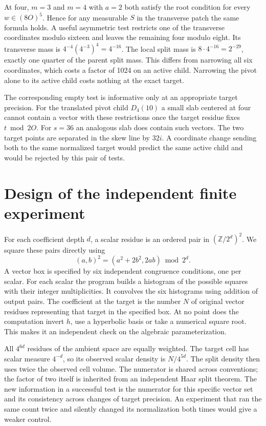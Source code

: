\documentclass[12pt,letterpaper]{article}
\begin{document}
At four, $m=3$ and $m=4$ with $a=2$ both satisfy the root condition for every $w\in(8O)^5$. Hence for any measurable $S$ in the transverse patch the same formula holds. A useful asymmetric test restricts one of the transverse coordinates modulo sixteen and leaves the remaining four modulo eight. Its transverse mass is $4^{-4}(4^{-3})^4=4^{-16}$. The local split mass is $8\cdot4^{-16}=2^{-29}$, exactly one quarter of the parent split mass. This differs from narrowing all six coordinates, which costs a factor of 1024 on an active child. Narrowing the pivot alone to its active child costs nothing at the exact target.

The corresponding empty test is informative only at an appropriate target precision. For the translated pivot child $D_4(10)$ a small slab centered at four cannot contain a vector with these restrictions once the target residue fixes $t\bmod2O$. For $s=36$ an analogous slab does contain such vectors. The two target points are separated in the skew line by $32i$. A coordinate change sending both to the same normalized target would predict the same active child and would be rejected by this pair of tests.

\section{Design of the independent finite experiment}
For each coefficient depth $d$, a scalar residue is an ordered pair in $(\mathbb Z/2^d)^2$. We square these pairs directly using
\[
       (a,b)^2=(a^2+2b^2,2ab)\bmod 2^d.
\]
A vector box is specified by six independent congruence conditions, one per scalar. For each scalar the program builds a histogram of the possible squares with their integer multiplicities. It convolves the six histograms using addition of output pairs. The coefficient at the target is the number $N$ of original vector residues representing that target in the specified box. At no point does the computation invert $h$, use a hyperbolic basis or take a numerical square root. This makes it an independent check on the algebraic parameterization.

All $4^{6d}$ residues of the ambient space are equally weighted. The target cell has scalar measure $4^{-d}$, so its observed scalar density is $N/4^{5d}$. The split density then uses twice the observed cell volume. The numerator is shared across conventions; the factor of two itself is inherited from an independent Haar split theorem. The new information in a successful test is the numerator for this specific vector set and its consistency across changes of target precision. An experiment that ran the same count twice and silently changed its normalization both times would give a weaker control.
\end{document}
